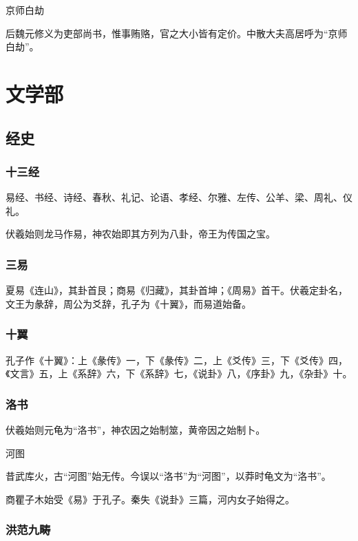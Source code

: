 \documentclass[a4paper,12pt,UTF8,twoside]{ctexbook}
\begin{document}
    京师白劫
    
    后魏元修义为吏部尚书，惟事贿赂，官之大小皆有定价。中散大夫高居呼为“京师白劫”。
    
    
    \part{文学部}
    
    \chapter{经史}
    
    \section{十三经}
    
    易经、书经、诗经、春秋、礼记、论语、孝经、尔雅、左传、公羊、梁、周礼、仪礼。
    
    伏羲始则龙马作易，神农始即其方列为八卦，帝王为传国之宝。
    
    \section{三易}
    
    夏易《连山》，其卦首艮；商易《归藏》，其卦首坤；《周易》首干。伏羲定卦名，文王为彖辞，周公为爻辞，孔子为《十翼》，而易道始备。
    
    \section{十翼}
    
    孔子作《十翼》：上《彖传》一，下《彖传》二，上《爻传》三，下《爻传》四，《文言》五，上《系辞》六，下《系辞》七，《说卦》八，《序卦》九，《杂卦》十。
    
    \section{洛书}
    
    伏羲始则元龟为“洛书”，神农因之始制筮，黄帝因之始制卜。
    
    河图
    
    昔武库火，古“河图”始无传。今误以“洛书”为“河图”，以莽时龟文为“洛书”。
    
    商瞿子木始受《易》于孔子。秦失《说卦》三篇，河内女子始得之。
    
    \section{洪范九畴}
    
\end{document}
